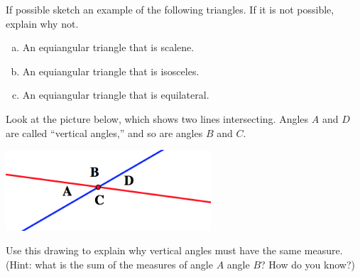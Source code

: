 \bigskip


\begin{problem}
If possible sketch an example of the following triangles.  If it is not possible, explain why not.

\begin{enumerate}[(a)]
\item
An equiangular triangle that is scalene.\\

\item
An equiangular triangle that is isosceles.\\

\item
An equiangular triangle that is equilateral.
\end{enumerate}
\end{problem}



  \bigskip

\begin{problem}
Look at the picture below, which shows two lines intersecting.  Angles $A$ and $D$ are called ``vertical angles,'' and so are angles $B$ and $C$.
\begin{center}
\includegraphics[height=3cm]{vertical}
\end{center}
Use this drawing to explain why vertical angles must have the same measure.  (Hint: what is the sum of the measures of angle $A$  angle $B$?  How do you know?)

\end{problem}


\newpage

